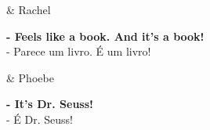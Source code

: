 \begin{tcolorbox}[enhanced,center upper,
    drop fuzzy shadow southeast, boxrule=0.3pt,
    lower separated=false, breakable,
    colframe=black!30!dialogoBorder,colback=white]
\begin{minipage}[c]{0.16\linewidth}
   & \centering \scriptsize{Rachel}
\end{minipage}
\hfill
\begin{minipage}[c]{0.8\linewidth}
  \textbf{- Feels like a book. And it's a book!}\\
  - Parece um livro. É um livro!
\end{minipage}

\medskip
\begin{minipage}[c]{0.16\linewidth}
   & \centering \scriptsize{Phoebe}
\end{minipage}
\hfill
\begin{minipage}[c]{0.8\linewidth}
  \textbf{- It's Dr. Seuss!}\\
  - É Dr. Seuss!
\end{minipage}
\end{tcolorbox}

